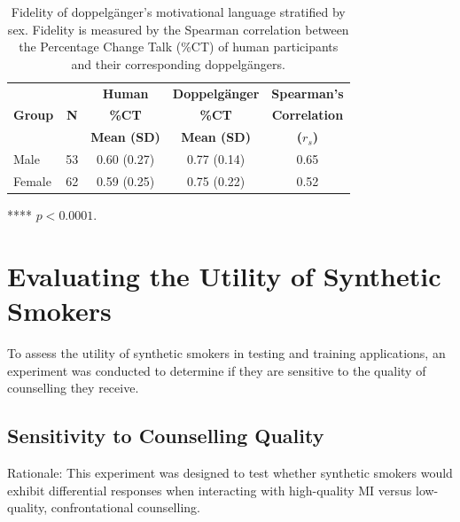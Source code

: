 \begin{table}[th!]
    \centering
    \begin{threeparttable}
        \begin{tabular}{@{}lcccc@{}}
        \toprule
        \textbf{} & \textbf{} & \textbf{Human} & \textbf{Doppelgänger} & \textbf{Spearman's} \\
        \textbf{Group} & \textbf{N} & \textbf{\%CT} & \textbf{\%CT} & \textbf{Correlation} \\
        \textbf{} & \textbf{} & \textbf{Mean (SD)} & \textbf{Mean (SD)} & \textbf{($r_s$)} \\
        \midrule
        Male & 53 & 0.60 (0.27) & 0.77 (0.14) & 0.65\tnote{****} \\
        Female & 62 & 0.59 (0.25) & 0.75 (0.22) & 0.52\tnote{****} \\
        \bottomrule
        \end{tabular}
        \begin{tablenotes}
            \item[****] \footnotesize $p < 0.0001$.
        \end{tablenotes}
    \end{threeparttable}
            \caption{Fidelity of doppelgänger's motivational language stratified by sex. Fidelity is measured by the Spearman correlation between the Percentage Change Talk (\%CT) of human participants and their corresponding doppelgängers.}
        \label{tab:doppelgänger-fidelity-sex}
\end{table}




\section{Evaluating the Utility of Synthetic Smokers}
To assess the utility of synthetic smokers in testing and training applications, an experiment was conducted to determine if they are sensitive to the quality of counselling they receive.

\subsection{Sensitivity to Counselling Quality}

Rationale: This experiment was designed to test whether synthetic smokers would exhibit differential responses when interacting with high-quality MI versus low-quality, confrontational counselling.

